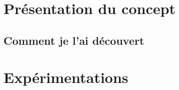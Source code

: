\section{Présentation du concept}

\subsection{Comment je l'ai découvert}

\section{Expérimentations}
